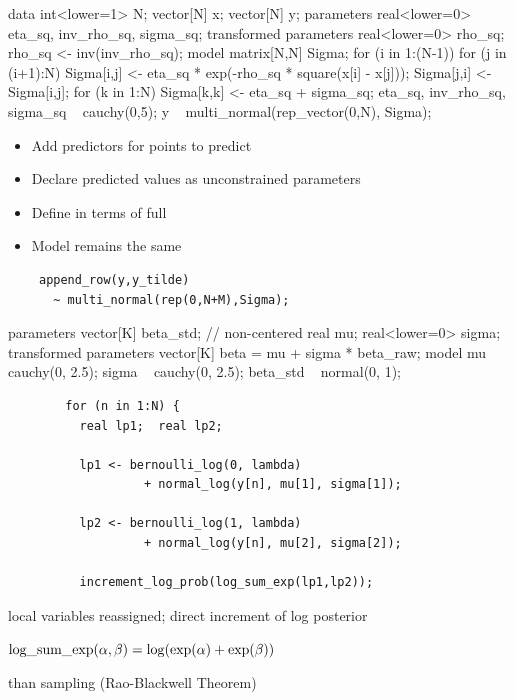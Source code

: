 \documentclass[10pt]{report}
\begin{document}
%
\vspace*{-5pt}
\begin{stancode}
data {
  int<lower=1> N;  vector[N] x; vector[N] y;
} parameters {
  real<lower=0> eta_sq, inv_rho_sq, sigma_sq;
} transformed parameters {
  real<lower=0> rho_sq; rho_sq <- inv(inv_rho_sq);
} model {
  matrix[N,N] Sigma;
  for (i in 1:(N-1)) {
    for (j in (i+1):N) {
      Sigma[i,j] <- eta_sq * exp(-rho_sq * square(x[i] - x[j]));
      Sigma[j,i] <- Sigma[i,j];
  }}
  for (k in 1:N) Sigma[k,k] <- eta_sq + sigma_sq;
  eta_sq, inv_rho_sq, sigma_sq ~ cauchy(0,5);
  y ~ multi_normal(rep_vector(0,N), Sigma);
}
\end{stancode}


%
\begin{itemize}
\item Add predictors  for points to predict
\item Declare predicted values  as unconstrained parameters
\item Define  in terms of full 
\item Model remains the same
{\small
\begin{Verbatim}
 append_row(y,y_tilde)
   ~ multi_normal(rep(0,N+M),Sigma);
\end{Verbatim}
}
\end{itemize}


%
\begin{stancode}
parameters {
  vector[K] beta_std;  // non-centered
  real mu;
  real<lower=0> sigma;
}
transformed parameters {
  vector[K] beta = mu + sigma * beta_raw;
}
model {
  mu ~ cauchy(0, 2.5);
  sigma ~ cauchy(0, 2.5);
  beta_std ~ normal(0, 1);
}
\end{stancode}


%
{\footnotesize
\begin{Verbatim}
        for (n in 1:N) {
          real lp1;  real lp2;

          lp1 <- bernoulli_log(0, lambda)
                   + normal_log(y[n], mu[1], sigma[1]);

          lp2 <- bernoulli_log(1, lambda)
                   + normal_log(y[n], mu[2], sigma[2]);

          increment_log_prob(log_sum_exp(lp1,lp2));
\end{Verbatim}
}
\vspace*{2pt}
\begin{subitemize}
\item local variables reassigned; direct increment of log posterior
\item $\mbox{\rm log\_sum\_exp}(\alpha,\beta) = \log (\exp(\alpha) + \exp(\beta))$
\item {} than sampling (Rao-Blackwell Theorem)
\vspace*{10pt}
\end{subitemize}
\end{document}
